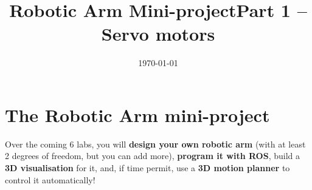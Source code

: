 \documentclass{instructions}
\title{Robotic Arm Mini-project\newline Part 1 -- Servo motors}
\date{\today}
\begin{document}
\maketitle




\pagebreak

\part{The Robotic Arm mini-project}

Over the coming 6 labs, you will \textbf{design your own robotic arm} (with at least 2
degrees of freedom, but you can add more), \textbf{program it with ROS}, build a
\textbf{3D visualisation} for it, and, if time permit, use a \textbf{3D motion
planner} to control it automatically!
\end{document}
